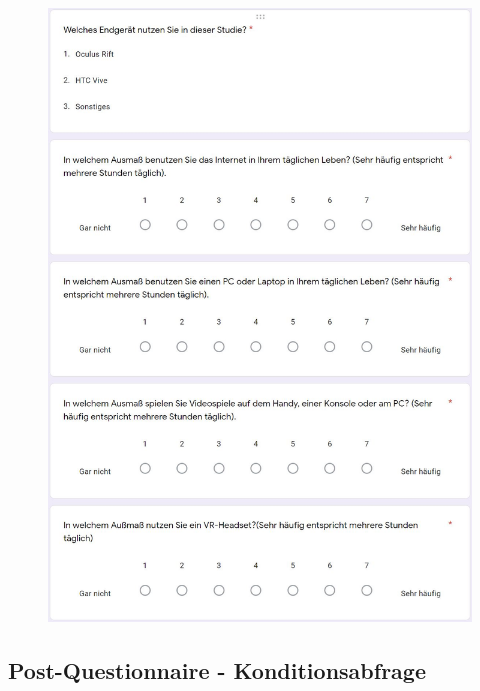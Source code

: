 \documentclass[a4paper,11pt]{article}%
\renewcommand{\\}{\vspace*{0.5\baselineskip} \newline}
\begin{document}
	\begin{figure}[H]
	\centering
		\begin{footnotesize}
			\includegraphics[scale=0.6]{Abbildungen/Fragebogen/Pre-Questionnaire/PQ6}\\
		\end{footnotesize}
	\end{figure}	
	
\subsection{Post-Questionnaire - Konditionsabfrage}
\label{Post-Questionnaire}
\label{Post-Questionnaire - Konditionsabfrage}
\end{document}
